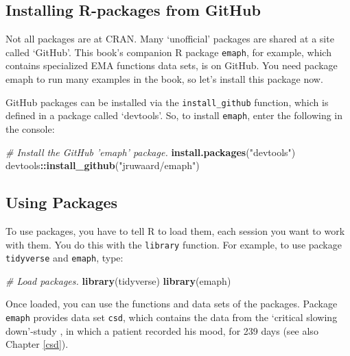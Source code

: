 \documentclass[]{book}
\newenvironment{Shaded}{\begin{snugshade}}{\end{snugshade}}
\newcommand{\KeywordTok}[1]{\textcolor[rgb]{0.13,0.29,0.53}{\textbf{#1}}}
\newcommand{\StringTok}[1]{\textcolor[rgb]{0.31,0.60,0.02}{#1}}
\newcommand{\CommentTok}[1]{\textcolor[rgb]{0.56,0.35,0.01}{\textit{#1}}}
\newcommand{\OperatorTok}[1]{\textcolor[rgb]{0.81,0.36,0.00}{\textbf{#1}}}
\newcommand{\NormalTok}[1]{#1}
\begin{document}
\subsection{Installing R-packages from
GitHub}\label{installing-r-packages-from-github}

 

Not all packages are at CRAN. Many `unofficial' packages are shared at a
site called `GitHub'. This book's companion R package \texttt{emaph},
for example, which contains specialized EMA functions data sets, is on
GitHub. You need package emaph to run many examples in the book, so
let's install this package now.

GitHub packages can be installed via the \texttt{install\_github}
function, which is defined in a package called `devtools'. So, to
install \texttt{emaph}, enter the following in the console:

\begin{Shaded}
\begin{Highlighting}[]
\CommentTok{# Install the GitHub 'emaph' package.}
\KeywordTok{install.packages}\NormalTok{(}\StringTok{"devtools"}\NormalTok{)}
\NormalTok{devtools}\OperatorTok{::}\KeywordTok{install_github}\NormalTok{(}\StringTok{"jruwaard/emaph"}\NormalTok{)}
\end{Highlighting}
\end{Shaded}

\subsection{Using Packages}\label{using-packages}


To use packages, you have to tell R to load them, each session you want
to work with them. You do this with the \texttt{library} function. For
example, to use package \texttt{tidyverse} and \texttt{emaph}, type:

\begin{Shaded}
\begin{Highlighting}[]
\CommentTok{# Load packages.}
\KeywordTok{library}\NormalTok{(tidyverse)}
\KeywordTok{library}\NormalTok{(emaph)}
\end{Highlighting}
\end{Shaded}

Once loaded, you can use the functions and data sets of the packages.
Package \texttt{emaph} provides data set \texttt{csd}, which contains
the data from the `critical slowing down'-study
\citep{Kossakowski2017, Wichers2016}, in which a patient recorded his
mood, for 239 days (see also Chapter \ref{csd}).
\end{document}

